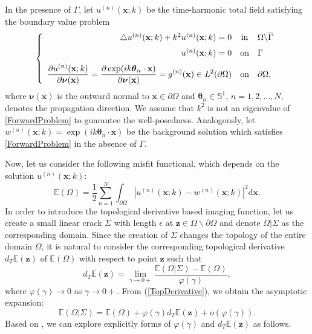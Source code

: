 \documentclass[a4,10pt]{article}
\newcommand{\p}{\partial}
\newcommand{\rd}{\mathrm{d}}
\newcommand{\mx}{\mathbf{x}}
\newcommand{\mz}{\mathbf{z}}
\newcommand{\vn}{\boldsymbol{\nu}}
\newcommand{\vt}{\boldsymbol{\theta}}
\theoremstyle{plain}
\theoremstyle{remark}
\begin{document}
In the presence of $\Gamma$, let $u^{(n)}(\mx;k)$ be the time-harmonic total field satisfying the boundary value problem
\begin{equation}\label{ForwardProblem}
\left\{\begin{array}{rcl}
\medskip\triangle u^{(n)}(\mx;k)+k^2 u^{(n)}(\mx;k)=0&\mbox{in}&\Omega\backslash\overline{\Gamma}\\
u^{(n)}(\mx;k)=0&\mbox{on}&\Gamma\\
\noalign{\medskip}\displaystyle\frac{\p u^{(n)}(\mx;k)}{\p\vn(\mx)}=\frac{\p\exp(ik\vt_n\cdot\mx)}{\p\vn(\mx)}=g^{(n)}(\mx)\in L^2(\partial\Omega)&\mbox{on}&\p\Omega,\\
\end{array}\right.
\end{equation}
where $\vn(\mx)$ is the outward normal to $\mx\in\p\Omega$ and $\vt_n\in\mathbb{S}^1$, $n=1,2,\ldots,N$, denotes the propagation direction. We assume that $k^2$ is not an eigenvalue of \eqref{ForwardProblem} to guarantee the well-posedness. Analogously, let $w^{(n)}(\mx;k)=\exp(ik\vt_n\cdot\mx)$ be the background solution which satisfies \eqref{ForwardProblem} in the absence of $\Gamma$.

Now, let us consider the following misfit functional, which depends on the solution $u^{(n)}(\mx;k)$:
\begin{equation}\label{Energy}
  \mathbb{E}(\Omega)=\frac12\sum_{n=1}^{N}\int_{\p\Omega}|u^{(n)}(\mx;k)-w^{(n)}(\mx;k)|^2\rd\mx.
\end{equation}
In order to introduce the topological derivative based imaging function, let us create a small linear crack $\Sigma$ with length $\epsilon$ at $\mz\in\Omega\backslash\partial\Omega$ and denote $\Omega|\Sigma$ as the corresponding domain. Since the creation of $\Sigma$ changes the topology of the entire domain $\Omega$, it is natural to consider the corresponding topological derivative $d_T\mathbb{E}(\mz)$ of $\mathbb{E}(\Omega)$ with respect to point $\mz$ such that
\begin{equation}\label{TopDerivative}
d_T\mathbb{E}(\mz)=\lim_{\gamma\to0+}\frac{\mathbb{E}(\Omega|\Sigma) -\mathbb{E}(\Omega)}{\varphi(\gamma)},
\end{equation}
where $\varphi(\gamma)\longrightarrow0$ as $\gamma\longrightarrow0+$. From (\ref{TopDerivative}), we obtain the asymptotic expansion:
\begin{equation}\label{AsymptoticExpansionTopologicalDerivative}
  \mathbb{E}(\Omega|\Sigma)=\mathbb{E}(\Omega)+\varphi(\gamma)d_T\mathbb{E}(\mz)+o(\varphi(\gamma)).
\end{equation}
Based on \cite{P-TD3}, we can explore explicitly forms of $\varphi(\gamma)$ and $d_T\mathbb{E}(\mz)$ as follows.
\end{document}
